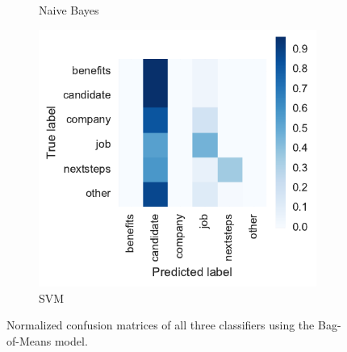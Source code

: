 \begin{figure}[h]
\begin{subfigure}[b]{0.32\textwidth}
        \caption{Naive Bayes}
        \label{fig:exp-vector-space-conf-matrix-bom-naivebayes-normalized}
    \end{subfigure}
    \begin{subfigure}[b]{0.32\textwidth}
        \includegraphics[width=\textwidth]{img/exp-vector-space-conf-matrix-bom-svm-normalized.pdf}
        \caption{SVM}
        \label{fig:exp-vector-space-conf-matrix-bom-svm-normalized}
    \end{subfigure}
    \caption{Normalized confusion matrices of all three classifiers using the Bag-of-Means model.}
  \label{fig:exp-vector-space-conf-matrix-bom}
\end{figure}

